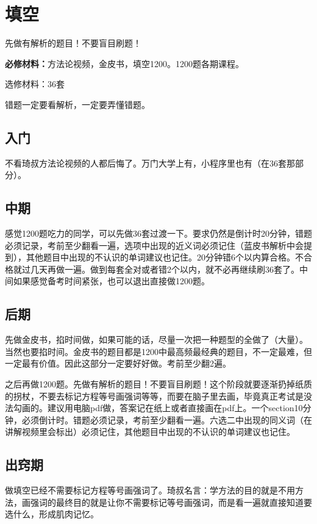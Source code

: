 \documentclass[cn,plain]{./src/qyxfbook}
\newenvironment{material}{\begin{tcolorbox}[title={材料}]}{\end{tcolorbox}}
\begin{document}
\section{填空}
先做有解析的题目！不要盲目刷题！

\begin{material}
\textbf{必修材料：}方法论视频，金皮书，填空1200。1200题各期课程。

选修材料：36套
\end{material}

错题一定要看解析，一定要弄懂错题。

\subsection{入门}
不看琦叔方法论视频的人都后悔了。万门大学上有，小程序里也有（在36套那部分）。

\subsection{中期}
感觉1200题吃力的同学，可以先做36套过渡一下。要求仍然是倒计时20分钟，错题必须记录，考前至少翻看一遍，选项中出现的近义词必须记住（蓝皮书解析中会提到），其他题目中出现的不认识的单词建议也记住。20分钟错6个以内算合格。不合格就过几天再做一遍。做到每套全对或者错2个以内，就不必再继续刷36套了。中间如果感觉备考时间紧张，也可以退出直接做1200题。

\subsection{后期}
先做金皮书，掐时间做，如果可能的话，尽量一次把一种题型的全做了（大量）。当然也要掐时间。金皮书的题目都是1200中最高频最经典的题目，不一定最难，但一定最有价值。因此这部分一定要好好做。考前至少翻2遍。

之后再做1200题。先做有解析的题目！不要盲目刷题！这个阶段就要逐渐扔掉纸质的拐杖，不要去标记方程等号画强词等等，而要在脑子里去画，毕竟真正考试是没法勾画的。建议用电脑pdf做，答案记在纸上或者直接画在pdf上。一个section10分钟，必须倒计时。错题必须记录，考前至少翻看一遍。六选二中出现的同义词（在讲解视频里会标出）必须记住，其他题目中出现的不认识的单词建议也记住。

\subsection{出窍期}
做填空已经不需要标记方程等号画强词了。琦叔名言：学方法的目的就是不用方法，画强词的最终目的就是让你不需要标记等号画强词，而是看一遍就直接知道要选什么，形成肌肉记忆。
\end{document}
